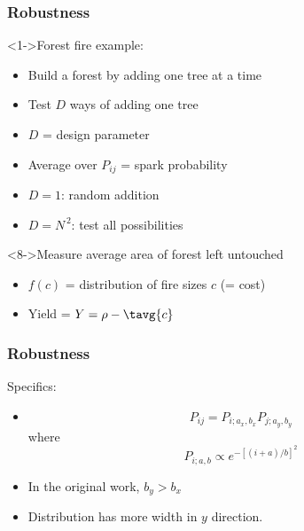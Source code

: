 \begin{frame}
  \frametitle{Robustness}

  \begin{block}<1->{Forest fire example:\cite{carlson2000a}}
    \begin{itemize}
    \item<2-> Build a forest by adding one tree at a time
    \item<3-> Test $D$ ways of adding one tree
    \item<4-> $D$ = \alert{design parameter}
    \item<5-> Average over $P_{ij}$ = spark probability
    \item<6-> $D=1$: random addition
    \item<7-> $D=N^{\, 2}$: test all possibilities
    \end{itemize}
  \end{block}

  \begin{block}<8->{Measure average area of forest left untouched}
    \begin{itemize}
    \item<9-> 
      $f(c)$ = distribution of fire sizes $c$ (= cost)
    \item<10-> 
      Yield  = $Y = \rho - \tavg{c}$
    \end{itemize}
  \end{block}

\end{frame}

\begin{frame}
  \frametitle{Robustness}

  \begin{block}{Specifics:}
    \begin{itemize}
    \item 
      $$ P_{ij} = P_{i;a_x,b_x} P_{j;a_y,b_y}$$
      where
      $$ P_{i;a,b}
      \propto
      e^{-[(i+a)/b]^2}
      $$
    \item
      In the original work, $b_y > b_x$
    \item
      Distribution has more width in $y$ direction.
    \end{itemize}
        
  \end{block}

\end{frame}
  
